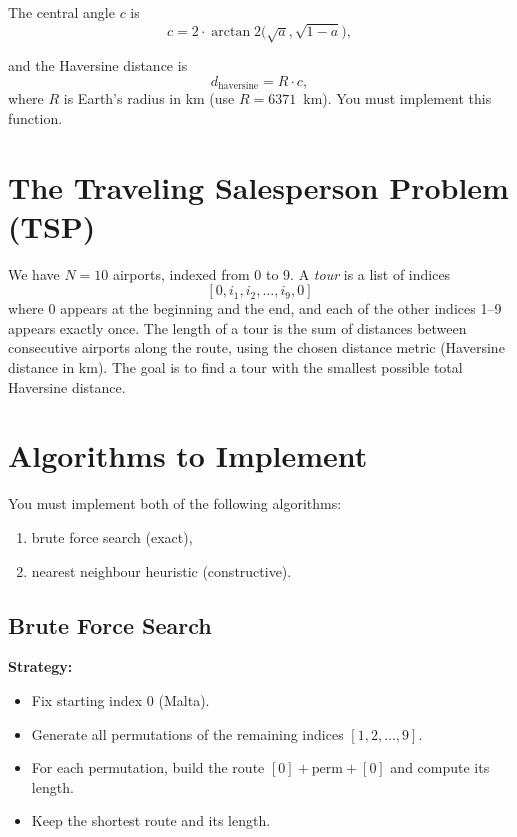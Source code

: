 \documentclass[11pt]{article}
\begin{document}
The central angle $c$ is
\[
 c = 2 \cdot \arctan2\bigl(\sqrt{a}, \sqrt{1 - a}\bigr),
\]

and the Haversine distance is
\[
 d_{\text{haversine}} = R \cdot c,
\]
where $R$ is Earth's radius in km (use $R = 6371$~km). You must implement this function.

%
%
%
%

\section{The Traveling Salesperson Problem (TSP)}
We have $N = 10$ airports, indexed from 0 to 9. A \emph{tour} is a list of indices
\[
 [0, i_1, i_2, \dots, i_9, 0]
\]
where 0 appears at the beginning and the end, and each of the other indices 1--9 appears exactly once. The length of a tour is the sum of distances between consecutive airports along the route, using the chosen distance metric (Haversine distance in km). The goal is to find a tour with the smallest possible total Haversine distance.

\section{Algorithms to Implement}
You must implement both of the following algorithms:
\begin{enumerate}
    \item brute force search (exact),
    \item nearest neighbour heuristic (constructive).
\end{enumerate}

\subsection{Brute Force Search}
\textbf{Strategy:}
\begin{itemize}
    \item Fix starting index 0 (Malta).
    \item Generate all permutations of the remaining indices $[1,2,\dots,9]$.
    \item For each permutation, build the route $[0] + \text{perm} + [0]$ and compute its length.
    \item Keep the shortest route and its length.
\end{itemize}
\end{document}
